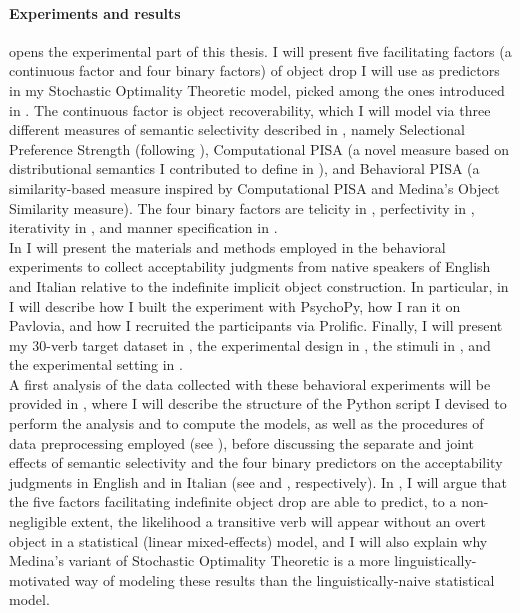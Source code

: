 \paragraph{Experiments and results}
 opens the experimental part of this thesis. I will present five facilitating factors (a continuous factor and four binary factors) of object drop I will use as predictors in my Stochastic Optimality Theoretic model, picked among the ones introduced in . The continuous factor is object recoverability, which I will model via three different measures of semantic selectivity described in , namely  Selectional Preference Strength (following \textcite{Medina2007}), Computational PISA (a novel measure based on distributional semantics I contributed to define in \textcite{CappelliLenciPISA}), and Behavioral PISA (a similarity-based measure inspired by Computational PISA and Medina's Object Similarity measure). The four binary factors are telicity in , perfectivity in , iterativity in , and manner specification in .\\
In  I will present the materials and methods employed in the behavioral experiments to collect acceptability judgments from native speakers of English and Italian relative to the indefinite implicit object construction. In particular, in  I will describe how I built the experiment with PsychoPy, how I ran it on Pavlovia, and how I recruited the participants via Prolific. Finally, I will present my 30-verb target dataset in , the experimental design in , the stimuli in , and the experimental setting in .\\
A first analysis of the data collected with these behavioral experiments will be provided in , where I will describe the structure of the Python script I devised to perform the analysis and to compute the models, as well as the procedures of data preprocessing employed (see ), before discussing the separate and joint effects of semantic selectivity and the four binary predictors on the acceptability judgments in English and in Italian (see  and , respectively). In , I will argue that the five factors facilitating indefinite object drop are able to predict, to a non-negligible extent, the likelihood a transitive verb will appear without an overt object in a statistical (linear mixed-effects) model, and I will also explain why Medina's variant of Stochastic Optimality Theoretic is a more linguistically-motivated way of modeling these results than the linguistically-naive statistical model.\\
